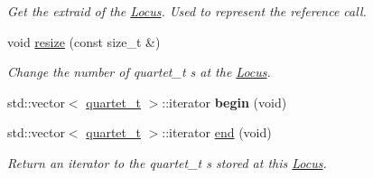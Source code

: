 \begin{DoxyCompactItemize}
\begin{DoxyCompactList}\small\item\em Get the extraid of the \hyperlink{classLocus}{Locus}. Used to represent the reference call. \end{DoxyCompactList}\item 
\hypertarget{classLocus_a85e869e3bdd9ba809c603503ed61d751}{void \hyperlink{classLocus_a85e869e3bdd9ba809c603503ed61d751}{resize} (const size\-\_\-t \&)}\label{classLocus_a85e869e3bdd9ba809c603503ed61d751}

\begin{DoxyCompactList}\small\item\em Change the number of quartet\-\_\-t s at the \hyperlink{classLocus}{Locus}. \end{DoxyCompactList}\item 
\hypertarget{classLocus_a9856c2ea54476766af7557ebbba07d0a}{std\-::vector$<$ \hyperlink{structquartet}{quartet\-\_\-t} $>$\-::iterator {\bfseries begin} (void)}\label{classLocus_a9856c2ea54476766af7557ebbba07d0a}

\item 
\hypertarget{classLocus_a6758be06e066d09c6743ed5a0c49528b}{std\-::vector$<$ \hyperlink{structquartet}{quartet\-\_\-t} $>$\-::iterator \hyperlink{classLocus_a6758be06e066d09c6743ed5a0c49528b}{end} (void)}\label{classLocus_a6758be06e066d09c6743ed5a0c49528b}

\begin{DoxyCompactList}\small\item\em Return an iterator to the quartet\-\_\-t s stored at this \hyperlink{classLocus}{Locus}. \end{DoxyCompactList}\end{DoxyCompactItemize}
